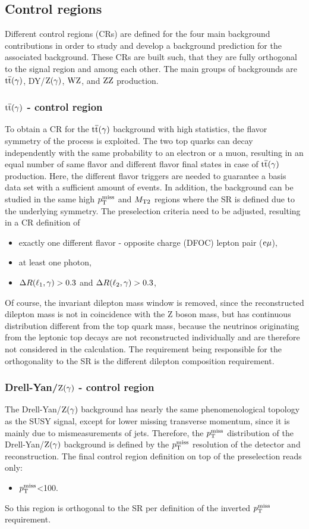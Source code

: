 \subsection{Control regions}\label{sec:CR}
Different control regions (CRs) are defined for the four main background contributions in order to study and develop a background prediction for the associated background. These CRs are built such, that they are fully orthogonal to the signal region and among each other. The main groups of backgrounds are ${\mathrm{t}\overline{\mathrm{t}}}(\gamma)$, DY/$\mathrm{Z}(\gamma)$, $\mathrm{W}\mathrm{Z}$, and $\mathrm{Z}\mathrm{Z}$ production.

\subsubsection*{${\mathrm{t}\overline{\mathrm{t}}}(\gamma)$ - control region}
To obtain a CR for the ${\mathrm{t}\overline{\mathrm{t}}}(\gamma)$ background with high statistics, the flavor symmetry of the process is exploited. The two top quarks can decay independently with the same probability to an electron or a muon, resulting in an equal number of same flavor and different flavor final states in case of ${\mathrm{t}\overline{\mathrm{t}}}(\gamma)$ production. Here, the different flavor triggers are needed to guarantee a basis data set with a sufficient amount of events. In addition, the background can be studied in the same high $p_{\mathrm{T}}^\text{miss}$ and $M_{\mathrm{T2}}$ regions where the SR is defined due to the underlying symmetry. The preselection criteria need to be adjusted, resulting in a CR definition of
\begin{itemize}
 \item exactly one different flavor - opposite charge (DFOC) lepton pair ($\mathrm{e}{\mu}$),
 \item at least one photon,
 \item $\Delta R(\ell_1,\gamma)>0.3$ and $\Delta R(\ell_2,\gamma)>0.3$,
\end{itemize}
Of course, the invariant dilepton mass window is removed, since the reconstructed dilepton mass is not in coincidence with the Z boson mass, but has continuous distribution different from the top quark mass, because the neutrinos originating from the leptonic top decays are not reconstructed individually and are therefore not considered in the calculation. The requirement being responsible for the orthogonality to the SR is the different dilepton composition requirement.
\subsubsection*{Drell-Yan/$\mathrm{Z}(\gamma)$ - control region}
The Drell-Yan/$\mathrm{Z}(\gamma)$ background has nearly the same phenomenological topology as the SUSY signal, except for lower missing transverse momentum, since it is mainly due to mismeasurements of jets. Therefore, the $p_{\mathrm{T}}^\text{miss}$ distribution of the Drell-Yan/$\mathrm{Z}(\gamma)$ background is defined by the $p_{\mathrm{T}}^\text{miss}$ resolution of the detector and reconstruction. The final control region definition on top of the preselection reads only:
\begin{itemize}
 \item $p_{\mathrm{T}}^\text{miss}$<100\GeV.
\end{itemize}
So this region is orthogonal to the SR per definition of the inverted $p_{\mathrm{T}}^\text{miss}$ requirement.
